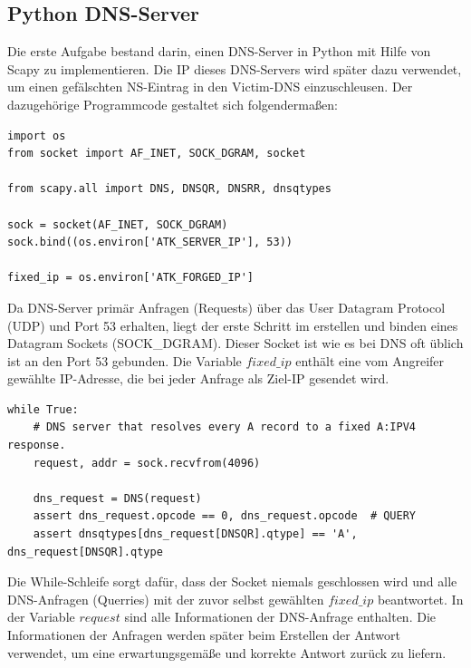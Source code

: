 \documentclass[10pt,a4paper]{article}
\begin{document}
\subsection{Python DNS-Server}
Die erste Aufgabe bestand darin, einen DNS-Server in Python mit Hilfe von Scapy zu implementieren. Die IP dieses DNS-Servers wird später dazu verwendet, um einen gefälschten NS-Eintrag in den Victim-DNS einzuschleusen. Der dazugehörige Programmcode gestaltet sich folgendermaßen:
\begin{center}
\begin{lstlisting}
import os
from socket import AF_INET, SOCK_DGRAM, socket

from scapy.all import DNS, DNSQR, DNSRR, dnsqtypes

sock = socket(AF_INET, SOCK_DGRAM)
sock.bind((os.environ['ATK_SERVER_IP'], 53))

fixed_ip = os.environ['ATK_FORGED_IP']
\end{lstlisting}
\end{center}
Da DNS-Server primär Anfragen (Requests) über das User Datagram Protocol (UDP) und Port 53 erhalten, liegt der erste Schritt im erstellen und binden eines Datagram Sockets (SOCK\_DGRAM). Dieser Socket ist wie es bei DNS oft üblich ist an den Port 53 gebunden. Die Variable $fixed\_ip$ enthält eine vom Angreifer gewählte IP-Adresse, die bei jeder Anfrage als Ziel-IP gesendet wird.
\begin{center}
\begin{lstlisting}
while True:
    # DNS server that resolves every A record to a fixed A:IPV4 response.
    request, addr = sock.recvfrom(4096)

    dns_request = DNS(request)
    assert dns_request.opcode == 0, dns_request.opcode  # QUERY
    assert dnsqtypes[dns_request[DNSQR].qtype] == 'A', dns_request[DNSQR].qtype
\end{lstlisting}
\end{center}
Die While-Schleife sorgt dafür, dass der Socket niemals geschlossen wird und alle DNS-Anfragen (Querries) mit der zuvor selbst gewählten $\mathit{fixed\_ip}$ beantwortet. In der Variable $\mathit{request}$ sind alle Informationen der DNS-Anfrage enthalten. Die Informationen der Anfragen werden später beim Erstellen der Antwort verwendet, um eine erwartungsgemäße und korrekte Antwort zurück zu liefern. 
\end{document}
